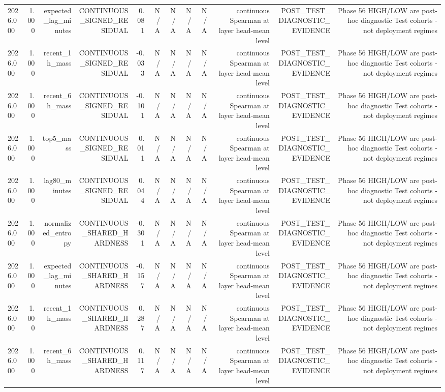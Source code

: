 \begin{table}[h!]
\begin{tabular}{lrrrrrrrrrrr}
2026.000 & 1.000 & expected\_lag\_minutes & CONTINUOUS\_SIGNED\_RESIDUAL & 0.081 & N/A & N/A & N/A & N/A & continuous Spearman at layer head-mean level & POST\_TEST\_DIAGNOSTIC\_EVIDENCE & Phase 56 HIGH/LOW are post-hoc diagnostic Test cohorts - not deployment regimes \\
2026.000 & 1.000 & recent\_1h\_mass & CONTINUOUS\_SIGNED\_RESIDUAL & -0.033 & N/A & N/A & N/A & N/A & continuous Spearman at layer head-mean level & POST\_TEST\_DIAGNOSTIC\_EVIDENCE & Phase 56 HIGH/LOW are post-hoc diagnostic Test cohorts - not deployment regimes \\
2026.000 & 1.000 & recent\_6h\_mass & CONTINUOUS\_SIGNED\_RESIDUAL & -0.101 & N/A & N/A & N/A & N/A & continuous Spearman at layer head-mean level & POST\_TEST\_DIAGNOSTIC\_EVIDENCE & Phase 56 HIGH/LOW are post-hoc diagnostic Test cohorts - not deployment regimes \\
2026.000 & 1.000 & top5\_mass & CONTINUOUS\_SIGNED\_RESIDUAL & 0.011 & N/A & N/A & N/A & N/A & continuous Spearman at layer head-mean level & POST\_TEST\_DIAGNOSTIC\_EVIDENCE & Phase 56 HIGH/LOW are post-hoc diagnostic Test cohorts - not deployment regimes \\
2026.000 & 1.000 & lag80\_minutes & CONTINUOUS\_SIGNED\_RESIDUAL & 0.044 & N/A & N/A & N/A & N/A & continuous Spearman at layer head-mean level & POST\_TEST\_DIAGNOSTIC\_EVIDENCE & Phase 56 HIGH/LOW are post-hoc diagnostic Test cohorts - not deployment regimes \\
2026.000 & 1.000 & normalized\_entropy & CONTINUOUS\_SHARED\_HARDNESS & -0.301 & N/A & N/A & N/A & N/A & continuous Spearman at layer head-mean level & POST\_TEST\_DIAGNOSTIC\_EVIDENCE & Phase 56 HIGH/LOW are post-hoc diagnostic Test cohorts - not deployment regimes \\
2026.000 & 1.000 & expected\_lag\_minutes & CONTINUOUS\_SHARED\_HARDNESS & -0.157 & N/A & N/A & N/A & N/A & continuous Spearman at layer head-mean level & POST\_TEST\_DIAGNOSTIC\_EVIDENCE & Phase 56 HIGH/LOW are post-hoc diagnostic Test cohorts - not deployment regimes \\
2026.000 & 1.000 & recent\_1h\_mass & CONTINUOUS\_SHARED\_HARDNESS & 0.287 & N/A & N/A & N/A & N/A & continuous Spearman at layer head-mean level & POST\_TEST\_DIAGNOSTIC\_EVIDENCE & Phase 56 HIGH/LOW are post-hoc diagnostic Test cohorts - not deployment regimes \\
2026.000 & 1.000 & recent\_6h\_mass & CONTINUOUS\_SHARED\_HARDNESS & 0.117 & N/A & N/A & N/A & N/A & continuous Spearman at layer head-mean level & POST\_TEST\_DIAGNOSTIC\_EVIDENCE & Phase 56 HIGH/LOW are post-hoc diagnostic Test cohorts - not deployment regimes \\

\end{tabular}
\end{table}
